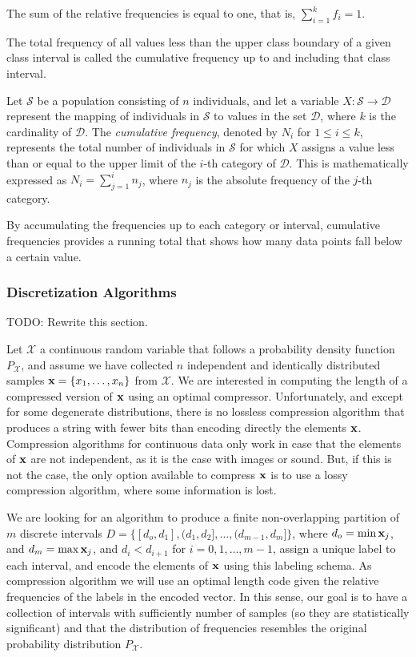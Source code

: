 The sum of the relative frequencies is equal to one, that is, $\sum_{i=1}^k f_i = 1$.

The total frequency of all values less than the upper class boundary of a given class interval is called the cumulative frequency up to and including that class interval.

\begin{definition}
Let $\mathcal{S}$ be a population consisting of $n$ individuals, and let a variable $X: \mathcal{S} \rightarrow \mathcal{D}$ represent the mapping of individuals in $\mathcal{S}$ to values in the set $\mathcal{D}$, where $k$ is the cardinality of $\mathcal{D}$. The \emph{cumulative frequency}, denoted by $N_i$ for $1 \leq i \leq k$, represents the total number of individuals in $\mathcal{S}$ for which $X$ assigns a value less than or equal to the upper limit of the $i$-th category of $\mathcal{D}$. This is mathematically expressed as $N_i = \sum_{j=1}^i n_j$, where $n_j$ is the absolute frequency of the $j$-th category.
\end{definition}

By accumulating the frequencies up to each category or interval, cumulative frequencies provides a running total that shows how many data points fall below a certain value.

\subsubsection*{Discretization Algorithms}

{\color{red} TODO: Rewrite this section.}

Let $\mathcal{X}$ a continuous random variable that follows a probability density function $P_\mathcal{X}$, and assume we have collected $n$ independent and identically distributed samples $\bold{x} = \{x_1, \ldots, x_n\}$ from $\mathcal{X}$. We are interested in computing the length of a compressed version of $\bold{x}$ using an optimal compressor. Unfortunately, and except for some degenerate distributions, there is no lossless compression algorithm that produces a string with fewer bits than encoding directly the elements $\bold{x}$. Compression algorithms for continuous data only work in case that the elements of $\bold{x}$ are not independent, as it is the case with images or sound. But, if this is not the case, the only option available to compress $\bold{x}$ is to use a lossy compression algorithm, where some information is lost.

We are looking for an algorithm to produce a finite non-overlapping partition of $m$ discrete intervals $D=\{ [d_o, d_1], (d_1, d_2], \ldots, (d_{m-1}, d_m] \}$, where $d_o = \min{\bold{x}_j}$, and $d_m = \max{\bold{x}_j}$, and $d_i < d_{i+1}$ for $i = 0, 1, \ldots, m-1$, assign a unique label to each interval, and encode the elements of $\bold{x}$ using this labeling schema. As compression algorithm we will use an optimal length code given the relative frequencies of the labels in the encoded vector. In this sense, our goal is to have a collection of intervals with sufficiently number of samples (so they are statistically significant) and that the distribution of frequencies resembles the original probability distribution $P_\mathcal{X}$.

